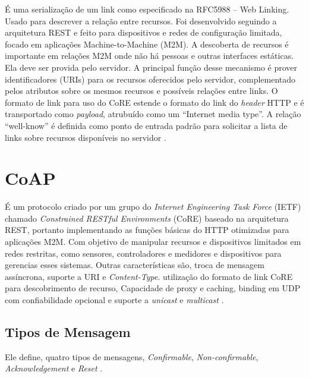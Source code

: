 É uma serialização de um link como especificado na RFC5988 – Web Linking. Usado para descrever a relação entre recursos. Foi desenvolvido seguindo a arquitetura REST e feito para dispositivos e redes de configuração limitada, focado em aplicações Machine-to-Machine (M2M). A descoberta de recursos é importante em relações M2M onde não há pessoas e outras interfaces estáticas. Ela deve ser provida pelo servidor.
A principal função desse mecanismo é prover identificadores (URIs) para os recursos oferecidos pelo servidor, complementado pelos atributos sobre os mesmos recursos e possíveis relações entre links. O formato de link para uso do CoRE estende o formato do link do \textit{header} HTTP e é transportado como \textit{payload}, atrubuído como um “Internet media type”. A relação “well-know” é definida como ponto de entrada padrão para solicitar a lista de links sobre recursos disponíveis no servidor \cite{rfc6690_core_link_format}.

\section{CoAP}

É um protocolo criado por um grupo do \textit{Internet Engineering Task Force} (IETF) chamado \textit{Constrained RESTful Environments} (CoRE) baseado na arquitetura REST, portanto implementando as funções básicas do HTTP otimizadas para aplicações M2M. Com objetivo de manipular recursos e dispositivos limitados em redes restritas, como sensores, controladores e medidores e dispositivos para gerencias esses sistemas.
Outras características são, troca de mensagem assíncrona, suporte a URI e \textit{Content-Type}. utilização do formato de link CoRE para descobrimento de recurso, Capacidade de proxy e caching, binding em UDP com confiabilidade opcional e suporte a \textit{unicast} e \textit{multicast} \cite{coap_mqtt_artigo} \cite{rfc7252_CoAP}.

\subsection{Tipos de Mensagem}
\label{subsection:msg_piggybacked}
Ele define, quatro tipos de mensagens, \textit{Confirmable}, \textit{Non-confirmable}, \textit{Acknowledgement} e \textit{Reset} \cite{rfc7252_CoAP}.


